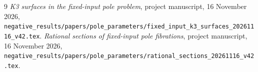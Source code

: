 \documentclass[11pt,a4paper]{article}
\theoremstyle{remark}\newtheorem{remark}[theorem]{Remark}
\begin{document}
\begingroup\raggedright
\begin{thebibliography}{9}
\emph{K3 surfaces in the fixed-input pole problem},
project manuscript, 16 November 2026,
\nolinkurl{negative_results/papers/pole_parameters/fixed_input_k3_surfaces_20261116_v42.tex}.
\emph{Rational sections of fixed-input pole fibrations},
project manuscript, 16 November 2026,
\nolinkurl{negative_results/papers/pole_parameters/rational_sections_20261116_v42.tex}.
\end{thebibliography}
\endgroup
\end{document}
